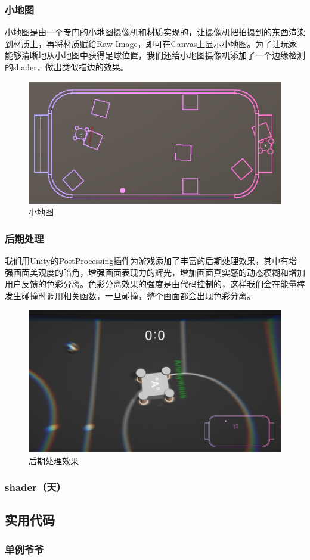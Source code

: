 \documentclass[conference]{IEEEtran}
\begin{document}
\subsubsection{小地图}
小地图是由一个专门的小地图摄像机和材质实现的，让摄像机把拍摄到的东西渲染到材质上，再将材质赋给Raw Image，即可在Canvas上显示小地图。为了让玩家能够清晰地从小地图中获得足球位置，我们还给小地图摄像机添加了一个边缘检测的shader，做出类似描边的效果。

\begin{figure}[htbp]
  \centerline{\includegraphics[width=.38\textwidth]{images/mini-map.png}}
  \caption{小地图}
  \label{fig:minimap}
\end{figure}

\subsubsection{后期处理}
我们用Unity的PostProcessing插件为游戏添加了丰富的后期处理效果，其中有增强画面美观度的暗角，增强画面表现力的辉光，增加画面真实感的动态模糊和增加用户反馈的色彩分离。色彩分离效果的强度是由代码控制的，这样我们会在能量棒发生碰撞时调用相关函数，一旦碰撞，整个画面都会出现色彩分离。

\begin{figure}[htbp]
  \centerline{\includegraphics[width=.38\textwidth]{images/pp.png}}
  \caption{后期处理效果}
  \label{fig:pp}
\end{figure}

\subsubsection{shader（天）}


\subsection{实用代码}
\subsubsection{单例爷爷}
\end{document}
